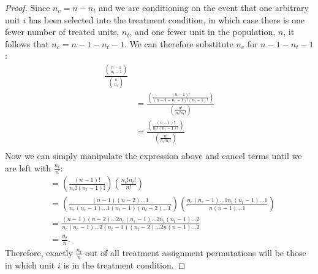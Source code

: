 \documentclass[12pt,leqno]{article}
\theoremstyle{newstyle}
\begin{document}
\begin{proof}
Since $n_c = n - n_t$ and we are conditioning on the event that one arbitrary unit $i$ has been selected into the treatment condition, in which case there is one fewer number of treated units, $n_t$, and one fewer unit in the population, $n$, it follows that $n_c = n - 1 - n_t - 1$. We can therefore substitute $n_c$ for $n - 1 - n_t - 1$:
\begin{align*}
\frac{\binom{n - 1}{n_t - 1}}{\binom{n}{n_t}} \\ 
& = \frac{\left(\frac{\left(n - 1\right)!}{\left(n - 1 - n_t - 1\right)!\left(n_t - 1\right)!}\right)}{\left(\frac{n!}{n_c!n_t!}\right)} \\
& = \frac{\left(\frac{\left(n - 1\right)!}{n_c!\left(n_t - 1\right)!}\right)}{\left(\frac{n!}{n_c!n_t!}\right)} \\
\end{align*}
Now we can simply manipulate the expression above and cancel terms until we are left with $\frac{n_t}{n}$:
\begin{align*}
& = \left(\frac{\left(n - 1\right)!}{n_c!\left(n_t - 1\right)!}\right)\left(\frac{n_c!n_t!}{n!}\right) \\
& = \left(\frac{\left(n - 1\right)\left(n - 2\right) \dots 1}{n_c\left(n_c - 1\right) \dots 1 \left(n_t - 1\right)\left(n_t - 2\right) \dots 1}\right) \left(\frac{n_c\left(n_c - 1\right) \dots 1 n_t \left(n_t - 1\right) \dots 1}{n\left(n - 1\right) \dots 1}\right) \\
& = \frac{\left(n - 1\right)\left(n - 2\right) \dots 2 n_c\left(n_c - 1\right) \dots 2 n_t \left(n_t - 1\right) \dots 2}{n_c\left(n_c - 1\right) \dots 2 \left(n_t - 1\right)\left(n_t - 2\right) \dots 2 n\left(n - 1\right) \dots 2} \\
& = \frac{n_t}{n}.
\end{align*}
Therefore, exactly $\frac{n_t}{n}$ out of all treatment assignment permutations will be those in which unit $i$ is in the treatment condition. 


\end{proof}
\end{document}
